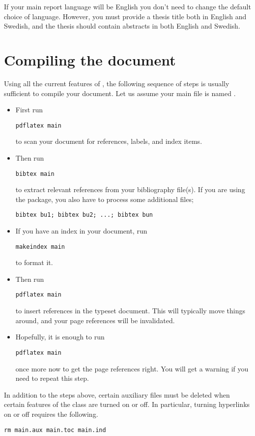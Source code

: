 If your main report language will be English you don't need to change the default choice of language.  However, you must provide a thesis title both in English and Swedish, and the thesis should contain abstracts in both English and Swedish.


\section{Compiling the document}
%
Using all the current features of \rtthesis, the following sequence of steps is usually sufficient to compile your document.  Let us assume your main file is named .
\begin{itemize}
\item
  First run
{\verbatimsize
\begin{verbatim}
pdflatex main
\end{verbatim}}
  to scan your document for references, labels, and index items.
\item
  Then run
{\verbatimsize
\begin{verbatim}
bibtex main
\end{verbatim}}
  to extract relevant references from your bibliography file(s).  If you are using the  package, you also have to process some additional files;
{\verbatimsize
\begin{verbatim}
bibtex bu1; bibtex bu2; ...; bibtex bun
\end{verbatim}}
\item
  If you have an index in your document, run
{\verbatimsize
\begin{verbatim}
makeindex main
\end{verbatim}}
  to format it.
\item
  Then run
{\verbatimsize
\begin{verbatim}
pdflatex main
\end{verbatim}}
  to insert references in the typeset document.  This will typically move things around, and your page references will be invalidated.
\item
  Hopefully, it is enough to run
{\verbatimsize
\begin{verbatim}
pdflatex main
\end{verbatim}}
  once more now to get the page references right.  You will get a warning if you need to repeat this step.
\end{itemize}

In addition to the steps above, certain auxiliary files must be deleted when certain features of the class are turned on or off.  In particular, turning hyperlinks on or off requires the following.
{\verbatimsize
\begin{verbatim}
rm main.aux main.toc main.ind
\end{verbatim}}


